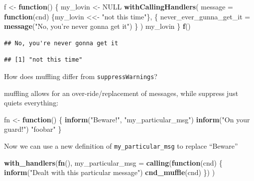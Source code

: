 \documentclass[]{book}
\newenvironment{Shaded}{\begin{snugshade}}{\end{snugshade}}
\newcommand{\ControlFlowTok}[1]{\textcolor[rgb]{0.13,0.29,0.53}{\textbf{#1}}}
\newcommand{\DataTypeTok}[1]{\textcolor[rgb]{0.13,0.29,0.53}{#1}}
\newcommand{\KeywordTok}[1]{\textcolor[rgb]{0.13,0.29,0.53}{\textbf{#1}}}
\newcommand{\NormalTok}[1]{#1}
\newcommand{\OtherTok}[1]{\textcolor[rgb]{0.56,0.35,0.01}{#1}}
\newcommand{\StringTok}[1]{\textcolor[rgb]{0.31,0.60,0.02}{#1}}
\begin{document}
\begin{Shaded}
\begin{Highlighting}[]
\NormalTok{f <-}\StringTok{ }\ControlFlowTok{function}\NormalTok{() \{}
\NormalTok{  my_lovin <-}\StringTok{ }\OtherTok{NULL}
  \KeywordTok{withCallingHandlers}\NormalTok{(}
    \DataTypeTok{message =} \ControlFlowTok{function}\NormalTok{(cnd) \{my_lovin <<-}\StringTok{ "not this time"}\NormalTok{\},}
\NormalTok{    \{}
\NormalTok{      never_ever_gunna_get_it =}\StringTok{ }\KeywordTok{message}\NormalTok{(}\StringTok{"No, you're never gonna get it"}\NormalTok{)}
\NormalTok{    \}}
\NormalTok{  )}
\NormalTok{  my_lovin}
\NormalTok{\}}
\KeywordTok{f}\NormalTok{()}
\end{Highlighting}
\end{Shaded}

\begin{verbatim}
## No, you're never gonna get it
\end{verbatim}

\begin{verbatim}
## [1] "not this time"
\end{verbatim}

How does muffling differ from \texttt{suppressWarnings}?

muffling allows for an over-ride/replacement of messages, while suppress just quiets everything:

\begin{Shaded}
\begin{Highlighting}[]
\NormalTok{fn <-}\StringTok{ }\ControlFlowTok{function}\NormalTok{() \{}
  \KeywordTok{inform}\NormalTok{(}\StringTok{"Beware!"}\NormalTok{, }\StringTok{"my_particular_msg"}\NormalTok{)}
  \KeywordTok{inform}\NormalTok{(}\StringTok{"On your guard!"}\NormalTok{)}
  \StringTok{"foobar"}
\NormalTok{\}}
\end{Highlighting}
\end{Shaded}

Now we can use a new definition of \texttt{my\_particular\_msg} to replace ``Beware''

\begin{Shaded}
\begin{Highlighting}[]
\KeywordTok{with_handlers}\NormalTok{(}\KeywordTok{fn}\NormalTok{(),}
  \DataTypeTok{my_particular_msg =} \KeywordTok{calling}\NormalTok{(}\ControlFlowTok{function}\NormalTok{(cnd) \{}
    \KeywordTok{inform}\NormalTok{(}\StringTok{"Dealt with this particular message"}\NormalTok{)}
    \KeywordTok{cnd_muffle}\NormalTok{(cnd)}
\NormalTok{  \})}
\NormalTok{)}
\end{Highlighting}
\end{Shaded}
\end{document}

